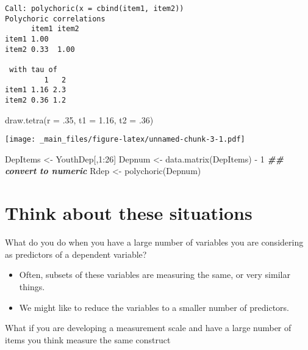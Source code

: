 \documentclass[
]{book}
\newenvironment{Shaded}{\begin{snugshade}}{\end{snugshade}}
\newcommand{\AttributeTok}[1]{\textcolor[rgb]{0.77,0.63,0.00}{#1}}
\newcommand{\DecValTok}[1]{\textcolor[rgb]{0.00,0.00,0.81}{#1}}
\newcommand{\DocumentationTok}[1]{\textcolor[rgb]{0.56,0.35,0.01}{\textbf{\textit{#1}}}}
\newcommand{\FloatTok}[1]{\textcolor[rgb]{0.00,0.00,0.81}{#1}}
\newcommand{\FunctionTok}[1]{\textcolor[rgb]{0.00,0.00,0.00}{#1}}
\newcommand{\NormalTok}[1]{#1}
\newcommand{\OtherTok}[1]{\textcolor[rgb]{0.56,0.35,0.01}{#1}}
\newcommand{\SpecialCharTok}[1]{\textcolor[rgb]{0.00,0.00,0.00}{#1}}
\providecommand{\tightlist}{%
  \setlength{\itemsep}{0pt}\setlength{\parskip}{0pt}}
\begin{document}
\begin{verbatim}
Call: polychoric(x = cbind(item1, item2))
Polychoric correlations 
      item1 item2
item1 1.00       
item2 0.33  1.00 

 with tau of 
         1   2
item1 1.16 2.3
item2 0.36 1.2
\end{verbatim}

\begin{Shaded}
\begin{Highlighting}[]
\FunctionTok{draw.tetra}\NormalTok{(}\AttributeTok{r =}\NormalTok{ .}\DecValTok{35}\NormalTok{, }\AttributeTok{t1 =} \FloatTok{1.16}\NormalTok{, }\AttributeTok{t2 =}\NormalTok{ .}\DecValTok{36}\NormalTok{)}
\end{Highlighting}
\end{Shaded}

\texttt{[image: \_main\_files/figure-latex/unnamed-chunk-3-1.pdf]}

\begin{Shaded}
\begin{Highlighting}[]
\NormalTok{DepItems }\OtherTok{\textless{}{-}}\NormalTok{ YouthDep[,}\DecValTok{1}\SpecialCharTok{:}\DecValTok{26}\NormalTok{] }
\NormalTok{Depnum }\OtherTok{\textless{}{-}} \FunctionTok{data.matrix}\NormalTok{(DepItems) }\SpecialCharTok{{-}} \DecValTok{1}  \DocumentationTok{\#\# convert to numeric   }
\NormalTok{Rdep }\OtherTok{\textless{}{-}} \FunctionTok{polychoric}\NormalTok{(Depnum)}
\end{Highlighting}
\end{Shaded}

\hypertarget{think-about-these-situations}{%
\section{Think about these situations}\label{think-about-these-situations}}

What do you do when you have a large number of variables you are considering as predictors of a dependent variable?

\begin{itemize}
\tightlist
\item
  Often, subsets of these variables are measuring the same, or very similar things.
\item
  We might like to reduce the variables to a smaller number of predictors.
\end{itemize}

What if you are developing a measurement scale and have a large number of items you think measure the same construct
\end{document}
